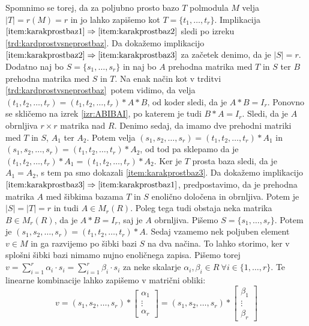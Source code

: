 \documentclass[mat1]{fmfdelo}
\newcommand{\abs}[1]{\ensuremath{\lvert #1 \rvert}}
\begin{document}
\begin{dokaz}
Spomnimo se torej, da za poljubno prosto bazo $T$ polmodula $M$ velja $\abs{T} = r(M) = r$ in jo lahko zapišemo kot $T = \{t_1, \ldots, t_r\}$. Implikacija $\ref{item:karakprostbaz1}\Rightarrow \ref{item:karakprostbaz2}$ sledi po izreku \ref{trd:kardprostvsneprostbaz}. Da dokažemo implikacijo $\ref{item:karakprostbaz2}\Rightarrow \ref{item:karakprostbaz3}$ za začetek denimo, da je $\abs{S} = r$. Dodatno naj bo $S = \{s_1, \ldots, s_r\}$ in naj bo $A$ prehodna matrika med $T$ in $S$ ter $B$ prehodna matrika med $S$ in $T$. Na enak način kot v trditvi \ref{trd:kardprostvsneprostbaz}~potem vidimo, da velja $(t_1, t_2, \ldots, t_r) = (t_1, t_2, \ldots, t_r)*A*B$, od koder sledi, da je $A*B = I_r$. Ponovno se skličemo na izrek \ref{izr:ABIBAI}, po katerem je tudi $B*A = I_r$. Sledi, da je $A$ obrnljiva $r\times r$ matrika nad $R$. Denimo sedaj, da imamo dve prehodni matriki med $T$ in $S$, $A_1$ ter $A_2$. Potem velja $(s_1, s_2, \ldots, s_r) = (t_1, t_2, \ldots, t_r)*A_1$ in $(s_1, s_2, \ldots, s_r) = (t_1, t_2, \ldots, t_r)*A_2$, od tod pa sklepamo da je $(t_1, t_2, \ldots, t_r)*A_1 = (t_1, t_2, \ldots, t_r)*A_2$. Ker je $T$ prosta baza sledi, da je $A_1 = A_2$, s tem pa smo dokazali \ref{item:karakprostbaz3}. Da dokažemo implikacijo $\ref{item:karakprostbaz3}\Rightarrow \ref{item:karakprostbaz1}$, predpostavimo, da je prehodna matrika $A$ med šibkima bazama $T$ in $S$ enolično določena in obrnljiva. Potem je $\abs{S} = \abs{T} = r$ in tudi $A\in M_r(R)$. Poleg tega tudi obstaja neka matrika $B\in M_r(R)$, da je $A*B =I_r$, saj je $A$ obrnljiva. Pišemo $S = \{s_1,\ldots,s_r\}$. Potem je $(s_1, s_2, \ldots, s_r) = (t_1, t_2, \ldots, t_r)*A$. Sedaj vzamemo nek poljuben element $v\in M$ in ga razvijemo po šibki bazi $S$ na dva načina. To lahko storimo, ker v splošni šibki bazi nimamo nujno enoličnega zapisa. Pišemo torej $v = \sum_{i = 1}^{r}\alpha_i\cdot s_i = \sum_{i = 1}^{r} \beta_i \cdot s_i$ za neke skalarje $\alpha_i, \beta_i \in R~\forall i\in \{1, \ldots, r\}$. Te linearne kombinacije lahko zapišemo v matrični obliki: $$ v = (s_1, s_2, \ldots, s_r)*\begin{bmatrix}
	\alpha_1 \\
	\vdots \\
	\alpha_r 
\end{bmatrix} = (s_1, s_2, \ldots, s_r)*\begin{bmatrix}
\beta_1 \\
\vdots \\
\beta_r 
\end{bmatrix}$$

\end{dokaz}
\end{document}

